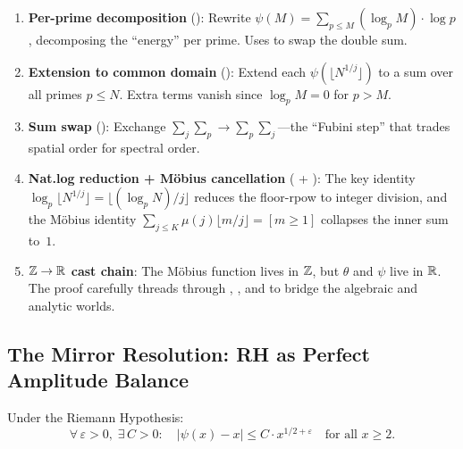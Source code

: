 \begin{enumerate}
  \item \textbf{Per-prime decomposition} ():
    Rewrite $\psi(M) = \sum_{p \leq M} (\log_p M) \cdot \log p$,
    decomposing the ``energy'' per prime. Uses 
    to swap the double sum.

  \item \textbf{Extension to common domain} ():
    Extend each $\psi(\lfloor N^{1/j} \rfloor)$ to a sum over
    all primes $p \leq N$. Extra terms vanish since
    $\log_p M = 0$ for $p > M$.

  \item \textbf{Sum swap} ():
    Exchange $\sum_j \sum_p \to \sum_p \sum_j$---the
    ``Fubini step'' that trades spatial order for spectral order.

  \item \textbf{Nat.log reduction + M\"obius cancellation}
    ( + ):
    The key identity $\log_p \lfloor N^{1/j} \rfloor = \lfloor (\log_p N)/j \rfloor$
    reduces the floor-rpow to integer division, and the M\"obius
    identity $\sum_{j \leq K} \mu(j) \lfloor m/j \rfloor = [m \geq 1]$
    collapses the inner sum to~$1$.

  \item \textbf{$\mathbb{Z} \to \mathbb{R}$ cast chain}: The M\"obius function
    lives in $\mathbb{Z}$, but $\theta$ and $\psi$ live in $\mathbb{R}$. The
    proof carefully threads through ,
    , and  to bridge the
    algebraic and analytic worlds.
\end{enumerate}

\subsection{The Mirror Resolution: RH as Perfect Amplitude Balance}

\begin{theorem}
Under the Riemann Hypothesis:
\begin{equation}
  \forall\,\varepsilon > 0,\; \exists\,C > 0 :\quad
  |\psi(x) - x| \leq C \cdot x^{1/2 + \varepsilon}
  \quad \text{for all } x \geq 2.
  \label{eq:rh-optimal}
\end{equation}
\end{theorem}

